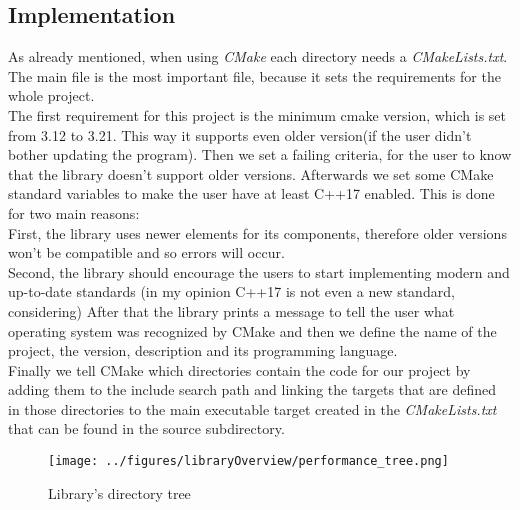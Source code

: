 \subsection{Implementation}
As already mentioned, when using \textit{CMake} each directory needs a \textit{CMakeLists.txt}. The main file is the most important file, because it sets the requirements for the whole project.\\
The first requirement for this project is the minimum cmake version, which is set from 3.12 to 3.21. This way it supports even older version(if the user didn't bother updating the program). Then we set a failing criteria, for the user to know that the library doesn't support older versions. Afterwards we set some CMake standard variables to make the user have at least C++17 enabled. This is done for two main reasons: \\
First, the library uses newer elements for its components, therefore older versions won't be compatible and so errors will occur.\\
Second, the library should encourage the users to start implementing modern and up-to-date standards (in my opinion C++17 is not even a new standard, considering)
After that the library prints a message to tell the user what operating system was recognized by CMake and then we define the name of the project, the version, description and its programming language.\\
Finally we tell CMake which directories contain the code for our project by adding them to the include search path and linking the targets that are defined in those directories to the main executable target created in the \textit{CMakeLists.txt} that can be found in the source subdirectory.\textsl{}
\begin{figure}[!htbp]
	\centering
	\texttt{[image: ../figures/libraryOverview/performance\_tree.png]}
	\caption{Library's directory tree}
\end{figure}